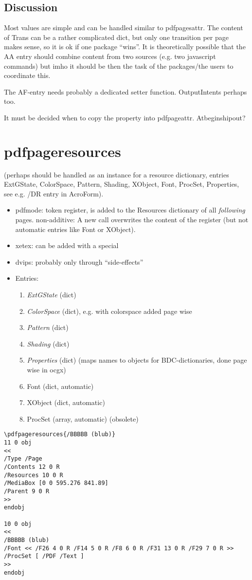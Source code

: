 \documentclass{article}
\begin{document}
\subsection{Discussion}

Most values are simple and can be handled similar to pdfpagesattr. The content of Trans can be a rather complicated dict, but only one transition per page makes sense, so it is ok if one package \enquote{wins}. It is theoretically possible that the AA entry should combine content from two sources (e.g. two javascript commands) but imho it should be then the task of the packages/the users to coordinate this.

The AF-entry needs probably a dedicated setter function. OutputIntents perhaps too.

It must be decided when to copy the property into pdfpageattr. Atbeginshipout?

\section{pdfpageresources}
(perhaps should be handled as an instance for a resource dictionary, entries ExtGState,
ColorSpace, Pattern, Shading, XObject, Font, ProcSet, Properties, see e.g. /DR entry in AcroForm).
\begin{itemize}
\item pdfmode: token register, is added to the Resources dictionary of all \emph{following} pages.
      non-additive: A new call overwrites the content of the register (but not automatic entries like Font or XObject).
\item xetex: can be added with a special
\item dvips: probably only through \enquote{side-effects}
\item Entries:
 \begin{enumerate}
 \item \emph{ExtGState} (dict)
 \item \emph{ColorSpace} (dict), e.g. with colorspace added page wise
 \item \emph{Pattern} (dict)
 \item \emph{Shading} (dict)
 \item \emph{Properties} (dict) (maps names to objects for BDC-dictionaries, done page wise in ocgx)
 \item Font (dict, automatic)
 \item XObject (dict, automatic)
 \item ProcSet (array, automatic) (obsolete)
 \end{enumerate}

\end{itemize}
\begin{verbatim}
\pdfpageresources{/BBBBB (blub)}
11 0 obj
<<
/Type /Page
/Contents 12 0 R
/Resources 10 0 R
/MediaBox [0 0 595.276 841.89]
/Parent 9 0 R
>>
endobj

10 0 obj
<<
/BBBBB (blub)
/Font << /F26 4 0 R /F14 5 0 R /F8 6 0 R /F31 13 0 R /F29 7 0 R >>
/ProcSet [ /PDF /Text ]
>>
endobj
\end{verbatim}
\end{document}
